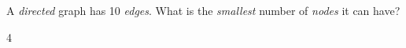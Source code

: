 \begin{prob}
    A \textit{directed} graph has 10 \textit{edges}. What is the \textit{smallest} number of
    \textit{nodes} it can have?

    \begin{soln}
        4
    \end{soln}

\end{prob}
